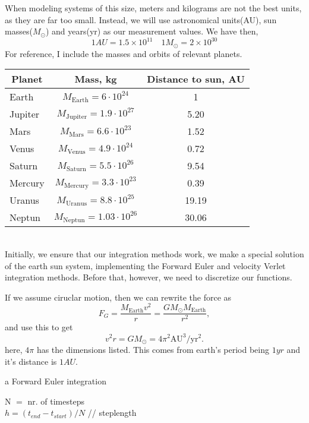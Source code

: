 \documentclass[10pt, twocolumn]{revtex4-1}
\begin{document}
When modeling systems of this size, meters and kilograms are not the best units, as they
are far too small. Instead, we will use astronomical units(AU), sun masses($M_{\odot}$) and years(yr) as our
measurement values. We have then,
\[
    1 AU = 1.5\times 10^{11} \quad 1 M_{\odot} = 2\times 10^{30}
\]
For reference, I include the masses and orbits of relevant planets.\cite{project3pdf}\\
\begin{tabular}{lcc}
\hline
\multicolumn{1}{c}{ Planet } & \multicolumn{1}{c}{ Mass, kg } & \multicolumn{1}{c}{ Distance to sun, AU } \\
\hline
Earth   & $M_{\mathrm{Earth}}=6\cdot 10^{24}$       & 1             \\
Jupiter & $M_{\mathrm{Jupiter}}=1.9\cdot 10^{27}$   & 5.20          \\
Mars    & $M_{\mathrm{Mars}}=6.6\cdot 10^{23}$      & 1.52          \\
Venus   & $M_{\mathrm{Venus}}=4.9\cdot 10^{24}$     & 0.72          \\
Saturn  & $M_{\mathrm{Saturn}}=5.5\cdot 10^{26}$    & 9.54          \\
Mercury & $M_{\mathrm{Mercury}}=3.3\cdot 10^{23}$   & 0.39          \\
Uranus  & $M_{\mathrm{Uranus}}=8.8\cdot 10^{25}$    & 19.19         \\
Neptun  & $M_{\mathrm{Neptun}}=1.03\cdot 10^{26}$   & 30.06         \\
\hline
\end{tabular}\\

Initially, we ensure that our integration methods work, we make a special solution of the earth sun system, implementing
the Forward Euler and velocity Verlet integration methods. Before that, however, we need to discretize our functions. 

If we assume ciruclar motion, then we can rewrite the force as 
\[
F_G= \frac{M_{\mathrm{Earth}}v^2}{r}=\frac{GM_{\odot}M_{\mathrm{Earth}}}{r^2},
\]
and use this to get 
\[
v^2r=GM_{\odot}=4\pi^2\mathrm{AU}^3/\mathrm{yr}^2.
\]
here, $4\pi$ has the dimensions listed. This comes from earth's period being $1 yr$ and it's distance is $1 AU$. 

\begin{algorithm}
    \caption{a Forward Euler integration}
    N $=$ nr. of timesteps \\
    $h = (t_{end} - t_{start})/N $ // steplength \\
\end{algorithm}
\end{document}
